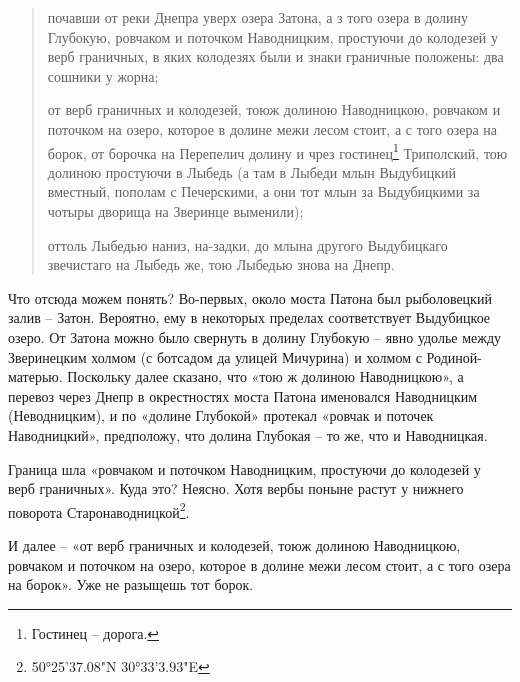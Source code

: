 \begin{quotation}
почавши от реки Днепра уверх озера Затона, а з того озера в долину Глубокую, ровчаком и поточком Наводницким, простуючи до колодезей у верб граничных, в яких колодезях были и знаки граничные положены: два сошники у жорна; 

от верб граничных и колодезей, тоюж долиною Наводницкою, ровчаком и поточком на озеро, которое в долине межи лесом стоит, а с того озера на борок, от борочка на Перепелич долину и чрез гостинец\footnote{Гостинец – дорога.} Триполский, тою долиною простуючи в Лыбедь (а там в Лыбеди млын Выдубицкий вместный, пополам с Печерскими, а они тот млын за Выдубицкими за чотыры дворища на Зверинце выменили);

оттоль Лыбедью наниз, на-задки, до млына другого Выдубицкаго звечистаго на Лыбедь же, тою Лыбедью знова на Днепр.
\end{quotation}

Что отсюда можем понять? Во-первых, около моста Патона был рыболовецкий залив – Затон. Вероятно, ему в некоторых пределах соответствует Выдубицкое озеро. От Затона можно было свернуть в долину Глубокую – явно удолье между Зверинецким холмом (с ботсадом да улицей Мичурина) и холмом с Родиной-матерью. Поскольку далее сказано, что «тою ж долиною Наводницкою», а перевоз через Днепр в окрестностях моста Патона именовался Наводницким (Неводницким), и по «долине Глубокой» протекал «ровчак и поточек Наводницкий», предположу, что долина Глубокая – то же, что и Наводницкая.

Граница шла «ровчаком и поточком Наводницким, простуючи до колодезей у верб граничных». Куда это? Неясно. Хотя вербы поныне растут у нижнего поворота Старонаводницкой\footnote{50°25'37.08"N 30°33'3.93"E}.

И далее – «от верб граничных и колодезей, тоюж долиною Наводницкою, ровчаком и поточком на озеро, которое в долине межи лесом стоит, а с того озера на борок». Уже не разыщешь тот борок.



